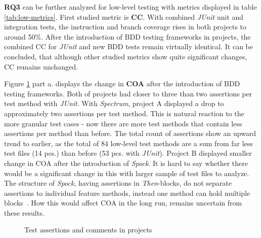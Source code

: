 \textbf{RQ3} can be further analyzed for low-level testing with metrics displayed in table \ref{tab:low-metrics}.
First studied metric is \textbf{CC}. With combined \textit{JUnit} unit and integration tests, the instruction and branch coverage rises in both projects
to around 50\%. After the introduction of BDD testing frameworks in projects, the combined CC for \textit{JUnit} and new BDD tests remain
virtually identical. It can be concluded, that although other studied metrics show quite significant changes, CC remains
unchanged.

Figure \ref{fig:coa-coc} part a. displays the change in \textbf{COA} after the introduction of BDD testing frameworks. Both of projects had closer to three
than two assertions per test method with \textit{JUnit}. With \textit{Spectrum}, project A displayed a drop to approximately
two assertions
per test method. This is natural reaction to the more granular test cases - now there are more test methods that contain
less assertions per method than before. The total count of assertions show an upward trend to earlier, as the total of 84 low-level
test methods are a sum from far less test files (14 pcs.) than before (53 pcs. with \textit{JUnit}).
Project B displayed smaller change in COA after the introduction of \textit{Spock}. It is hard to say whether there would be a significant
change in this with larger sample of test files to analyze. The structure of \textit{Spock}, having assertions in \textit{Then}-blocks,
do not separate assertions to individual feature methods, instead one method can hold multiple blocks~\cite{spock}. How
this would affect COA in the long run, remains uncertain from these results.

    \begin{figure}[H]%
        \centering
        \qquad
        \caption{Test assertions and comments in projects}%
        \label{fig:coa-coc}%
    \end{figure}

